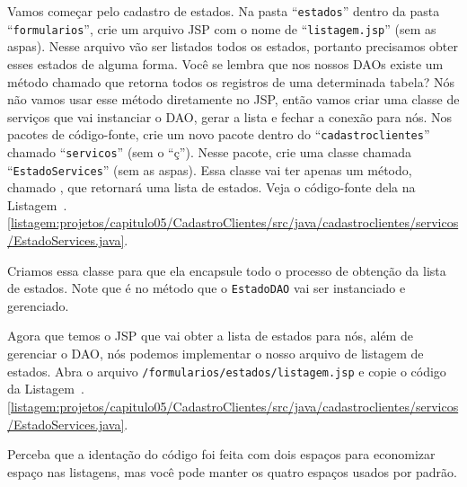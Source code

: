 Vamos começar pelo cadastro de estados. Na pasta ``\texttt{estados}'' dentro da pasta\linebreak%
``\texttt{formularios}'', crie um arquivo JSP com o nome de ``\texttt{listagem.jsp}'' (sem as aspas). Nesse arquivo vão ser listados todos os estados, portanto precisamos obter esses estados de alguma forma. Você se lembra que nos nossos DAOs existe um método chamado  que retorna todos os registros de uma determinada tabela? Nós não vamos usar esse método diretamente no JSP, então vamos criar uma classe de serviços que vai instanciar o DAO, gerar a lista e fechar a conexão para nós. Nos pacotes de código-fonte, crie um novo pacote dentro do ``\texttt{cadastroclientes}'' chamado ``\texttt{servicos}'' (sem o ``ç''). Nesse pacote, crie uma classe chamada ``\texttt{EstadoServices}'' (sem as aspas). Essa classe vai ter apenas um método, chamado , que retornará uma lista de estados. Veja o código-fonte dela na Listagem~\thechapter.\ref{listagem:projetos/capitulo05/CadastroClientes/src/java/cadastroclientes/servicos/EstadoServices.java}.


Criamos essa classe para que ela encapsule todo o processo de obtenção da lista de estados. Note que é no método  que o \texttt{EstadoDAO} vai ser instanciado e gerenciado.

Agora que temos o JSP que vai obter a lista de estados para nós, além de gerenciar o DAO, nós podemos implementar o nosso arquivo de listagem de estados. Abra o arquivo \texttt{/formularios/estados/listagem.jsp} e copie o código da Listagem~\thechapter.\ref{listagem:projetos/capitulo05/CadastroClientes/src/java/cadastroclientes/servicos/EstadoServices.java}.


Perceba que a identação do código foi feita com dois espaços para economizar espaço nas listagens, mas você pode manter os quatro espaços usados por padrão.

